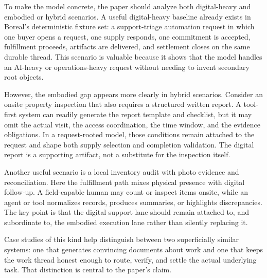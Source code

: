 To make the model concrete, the paper should analyze both digital-heavy and embodied or hybrid scenarios. A useful digital-heavy baseline already exists in Boreal's deterministic fixture set: a support-triage automation request in which one buyer opens a request, one supply responds, one commitment is accepted, fulfillment proceeds, artifacts are delivered, and settlement closes on the same durable thread. This scenario is valuable because it shows that the model handles an AI-heavy or operations-heavy request without needing to invent secondary root objects.

However, the embodied gap appears more clearly in hybrid scenarios. Consider an onsite property inspection that also requires a structured written report. A tool-first system can readily generate the report template and checklist, but it may omit the actual visit, the access coordination, the time window, and the evidence obligations. In a request-rooted model, those conditions remain attached to the request and shape both supply selection and completion validation. The digital report is a supporting artifact, not a substitute for the inspection itself.

Another useful scenario is a local inventory audit with photo evidence and reconciliation. Here the fulfillment path mixes physical presence with digital follow-up. A field-capable human may count or inspect items onsite, while an agent or tool normalizes records, produces summaries, or highlights discrepancies. The key point is that the digital support lane should remain attached to, and subordinate to, the embodied execution lane rather than silently replacing it.

Case studies of this kind help distinguish between two superficially similar systems: one that generates convincing documents about work and one that keeps the work thread honest enough to route, verify, and settle the actual underlying task. That distinction is central to the paper's claim.
